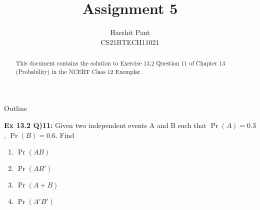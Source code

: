 \documentclass{beamer}
\title{Assignment 5}
\author{Harshit Pant\\CS21BTECH11021}
\date{}
\providecommand{\pr}[1]{\ensuremath{\Pr\left(#1\right)}}
\begin{document}
\begin{frame}
    \titlepage 
\end{frame}
\begin{frame}{Outline}
\begin{abstract}
This document contains the solution to Exercise 13.2 Question 11 of Chapter 13 (Probability) in the NCERT Class 12 Exemplar.
\end{abstract}
\textbf{Ex 13.2 Q)11: }Given two independent events A and B such that $\pr{A}=0.3$, $\pr{B}=0.6$. Find
\begin{enumerate}[i]
\item $\pr{AB}$
\item $\pr{AB'}$
\item $\pr{A+B}$
\item $\pr{A'B'}$
\end{enumerate}
\end{frame}
\end{document}

